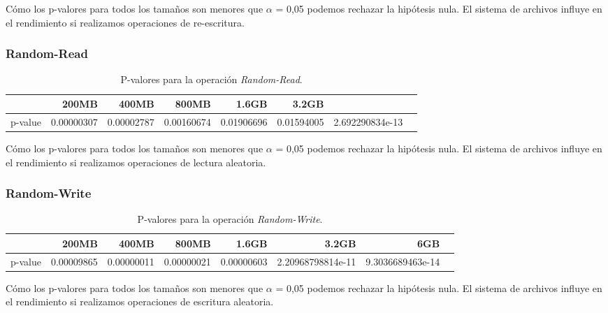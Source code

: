 Cómo los p-valores para todos los tamaños son menores que $\alpha$ = 0,05 podemos rechazar la hipótesis nula. El sistema de archivos influye en el rendimiento si realizamos operaciones de re-escritura. 

\subsubsection{Random-Read}
\begin{table}[!htp]\centering
\scriptsize
\begin{tabular}{lrrrrrrr}\toprule
&200MB &400MB &800MB &1.6GB &3.2GB \\\midrule
p-value &0.00000307 &0.00002787 &0.00160674 &0.01906696 &0.01594005 &2.692290834e-13 \\
\bottomrule
\end{tabular}
\caption{P-valores para la operación \textit{Random-Read}.}\label{tab: }
\end{table}

 Cómo los p-valores para todos los tamaños son menores que $\alpha$ = 0,05 podemos rechazar la hipótesis nula. El sistema de archivos influye en el rendimiento si realizamos operaciones de lectura aleatoria. 

\subsubsection{Random-Write}
\begin{table}[!htp]\centering
\scriptsize
\begin{tabular}{lrrrrrrr}\toprule
&200MB &400MB &800MB &1.6GB &3.2GB &6GB \\\midrule
p-value &0.00009865 &0.00000011 &0.00000021 &0.00000603 &2.20968798814e-11 &9.3036689463e-14 \\
\bottomrule
\end{tabular}
\caption{P-valores para la operación \textit{Random-Write}.}\label{tab: }
\end{table}

Cómo los p-valores para todos los tamaños son menores que $\alpha$ = 0,05 podemos rechazar la hipótesis nula. El sistema de archivos influye en el rendimiento si realizamos operaciones de escritura aleatoria. 













\newpage
